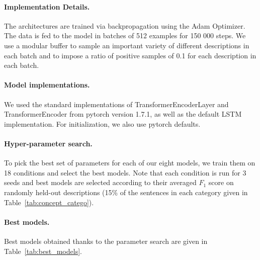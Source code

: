 \paragraph{Implementation Details. }The architectures are trained via backpropagation using the Adam Optimizer\cite{kingma2017adam}. The data is fed to the model in batches of 512 examples for 150 000 steps.  We use a modular buffer to sample an important variety of different descriptions in each batch and to impose a ratio of positive samples of 0.1 for each description in each batch. 

\paragraph{Model implementations.}

We used the standard implementations of TransformerEncoderLayer and TransformerEncoder from pytorch version 1.7.1, as well as the default LSTM implementation. For initialization, we also use pytorch defaults.

\paragraph{Hyper-parameter search. } To pick the best set of parameters for each of our eight models, we train them on 18 conditions and select the best models. Note that each condition is run for 3 seeds and best models are selected according to their averaged $F_1$ score on randomly held-out descriptions (15\% of the sentences in each category given in Table~\ref{tab:concept_catego}). 

\paragraph{Best models. } Best models obtained thanks to the parameter search are given in Table~\ref{tab:best_models}.

